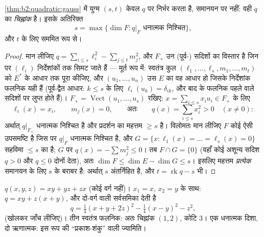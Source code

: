 \begin{theorem}[सिल्वेस्टर का जड़त्व नियम]\label{thm:b2:quadratic:sylvester}
\cref{thm:b2:quadratic:gauss} में युग्म $(s, t)$ केवल $q$ पर निर्भर करता है, समानयन पर नहीं: वही $q$ का
\emph{चिह्नांक} है। इसके अतिरिक्त
\[
s = \max\{\dim F : q|_F \text{ धनात्मक निश्चित}\},
\]
और $t$ के लिए सममित रूप से।
\end{theorem}

\begin{proof}
मान लीजिए $q = \sum_{i \leq s}\ell_i^2 - \sum_{j\leq t} m_j^2$, और $F_+$ उन (पूर्व-) सदिशों का विस्तार है जिन पर $(\ell_i)$
निर्देशांकों तक सिमट जाते हैं --- मूर्त रूप में: स्वतंत्र कुल $(\ell_1, \dots, \ell_s, m_1, \dots, m_t)$ को
 $E^*$ के आधार तक पूरा कीजिए, और $(u_1, \dots, u_n)$ उस $E$ का वह आधार हो जिसके
निर्देशांक फलनिक यही हैं (पूर्व-द्वैत आधार: $k \leq s$ के लिए $\ell_i(u_k) = \delta_{ik}$, और बाद के
फलनिक पहले वाले सदिशों पर लुप्त होते हैं)। $F_+ =
\operatorname{Vect}(u_1, \dots, u_s)$ रखिए: $x = \sum_{i\leq
s}x_iu_i \in F_+$ के लिए
\[
\ell_i(x) = x_i,
\qquad m_j(x) = 0,
\qquad\text{अतः}\qquad
q(x) = \sum_{i\leq s}x_i^2 > 0 \quad (x \neq 0) :
\]
अर्थात् $q|_{F_+}$ धनात्मक निश्चित है और प्रदर्शन का महत्तम $\geq s$ है। विलोमतः
मान लीजिए $F$ कोई ऐसी उपसमष्टि है जिस पर $q|_F$ धनात्मक निश्चित है, और
$G = \{x : \ell_1(x) = \dots = \ell_s(x) =
0\}$ सहविमा $\leq s$ का है; $G$ पर $q(x) = -\sum m_j^2 \leq 0$। तब $F \cap G = \{0\}$ (वहाँ कोई अशून्य सदिश $q > 0$
और $q \leq 0$ दोनों देता), अतः $\dim F \leq \dim E - \dim G \leq s$। इसलिए महत्तम \emph{प्रत्येक} समानयन के लिए
$s$ के बराबर है: अर्थात् $s$ अंतर्निहित है, और $t
= \operatorname{rk} q - s$ भी।
\end{proof}

\begin{example}\label{ex:b2:quadratic:gaussexample}
$q(x, y, z) = xy + yz + zx$ (कोई वर्ग नहीं)। $x_1 = x$, $x_2 =
y$ के साथ: $q = xy + z(x + y)$, और दो-वर्ग वाली सर्वसमिका देती
है
\[
q = \tfrac14(x + y + 2z)^2 - \tfrac14(x - y)^2 - z^2 ,
\]
(खोलकर जाँच लीजिए)। तीन स्वतंत्र फलनिक: अतः चिह्नांक $(1, 2)$, कोटि $3$। एक
धनात्मक दिशा, दो ऋणात्मक: इस रूप की ``प्रकाश-शंकु'' वाली ज्यामिति।
\end{example}

